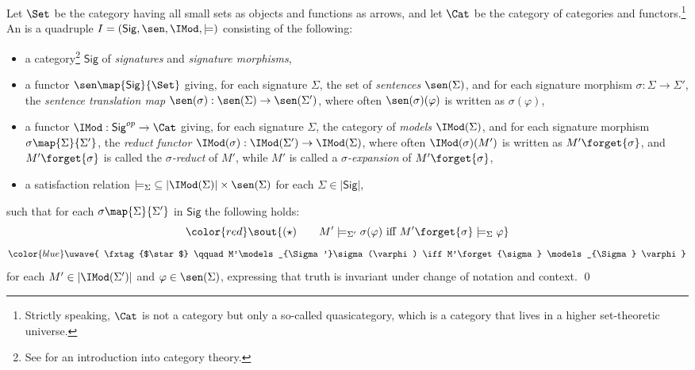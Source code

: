 \documentclass[10pt,fleqn,final]{scrreprt}
\newcommand{\Sig}{\mathsf{Sig}}
\providecommand{\DIFadd}[1]{{\protect\color{blue}\uwave{#1}}} %
\providecommand{\DIFdel}[1]{{\protect\color{red}\sout{#1}}}                      %
\providecommand{\DIFaddbegin}{} %
\providecommand{\DIFaddend}{} %
\providecommand{\DIFdelbegin}{} %
\providecommand{\DIFdelend}{} %
\begin{document}
\begin{definition}\label{def:inst}  Let $\Set$ be the
category having all small \textsc{}sets as objects and functions as
arrows, and let $\Cat$ be the category
of categories and functors.\footnote {Strictly speaking, $\Cat$ is not a
category but only a so-called quasicategory, which is a category that
lives in a higher set-theoretic universe.}
An
 \cite{GoguenBurstall92} is a quadruple $I=(\Sig,\sen,\IMod,{\models})$
consisting of the following:
%
\begin{itemize}
\item a category\footnote{See \cite{AHS,MacLane} for an introduction into category theory.} $\Sig$ of \emph{signatures} and \emph{signature morphisms},
\item a functor $\sen\map{\Sig}{\Set}$  giving, for each signature $\Sigma$, the set of
\emph{sentences} $\sen(\Sigma)$, and for each signature morphism
$\sigma:{\Sigma}\to{\Sigma'}$, the \emph{sentence translation map}
$\sen(\sigma):{\sen(\Sigma)}\to{\sen(\Sigma')}$, where often
$\sen(\sigma)(\varphi)$ is written as $\sigma(\varphi)$, \item a
functor $\IMod:{\Sig^{op}}\to{\Cat}$ giving, for each signature
$\Sigma$, the category of \emph{models} $\IMod(\Sigma)$, and for each
signature morphism $\sigma\map{\Sigma}{\Sigma'}$, the \emph{reduct
functor\/} $\IMod(\sigma):{\IMod(\Sigma')}\to {\IMod(\Sigma)}$, where
often $\IMod(\sigma)(M')$ is written as $M'\forget{\sigma}$, and
$M'\forget{\sigma}$ is called the \emph{$\sigma$-reduct} of $M'$,
while $M'$ is called a \emph{$\sigma$-expansion} of
$M'\forget{\sigma}$,
\item a satisfaction relation
${\models_{\Sigma}}\subseteq|{\IMod(\Sigma)|\times\sen(\Sigma)}$ for
each $\Sigma\in |\Sig|$,
\end{itemize}
%
such that for each $\sigma\map{\Sigma}{\Sigma'}$ in $\Sig$ the following  holds:
\DIFdelbegin \begin{displaymath}\DIFdel{
(\star) \qquad M'\models_{\Sigma'}\sigma(\varphi) \mbox{ iff }
M'\forget{\sigma} \models_{\Sigma} \varphi
}\end{displaymath}
\DIFdelend %
\DIFaddbegin \begin{equation}\DIFadd{
\tag{$\star$} \qquad M'\models_{\Sigma'}\sigma(\varphi) \iff
M'\forget{\sigma} \models_{\Sigma} \varphi
}\end{equation}
\DIFaddend for each $M'\in |\IMod(\Sigma')|$ and $\varphi\in \sen(\Sigma)$,
expressing that truth is invariant under change of notation and
context.  \qed
\end{definition}
\end{document}
